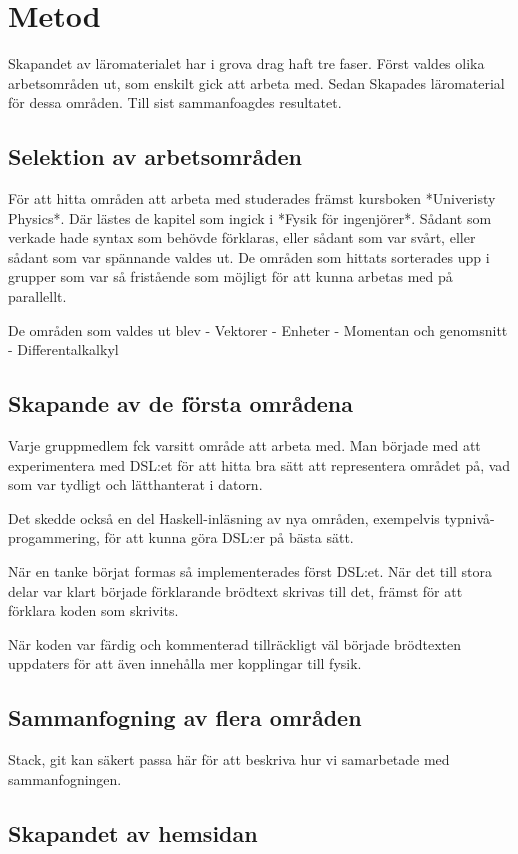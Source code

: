 
\chapter{Metod}

Skapandet av läromaterialet har i grova drag haft tre faser. Först valdes olika arbetsområden ut, som enskilt gick att arbeta med. Sedan Skapades läromaterial för dessa områden. Till sist sammanfoagdes resultatet.

\section{Selektion av arbetsområden}

För att hitta områden att arbeta med studerades främst kursboken *Univeristy Physics*. Där lästes de kapitel som ingick i *Fysik för ingenjörer*. Sådant som verkade hade syntax som behövde förklaras, eller sådant som var svårt, eller sådant som var spännande valdes ut. De områden som hittats sorterades upp i grupper som var så fristående som möjligt för att kunna arbetas med på parallellt.

De områden som valdes ut blev
- Vektorer
- Enheter
- Momentan och genomsnitt
- Differentalkalkyl

\section{Skapande av de första områdena}

Varje gruppmedlem fck varsitt område att arbeta med. Man började med att experimentera med DSL:et för att hitta bra sätt att representera området på, vad som var tydligt och lätthanterat i datorn.

Det skedde också en del Haskell-inläsning av nya områden, exempelvis typnivå-progammering, för att kunna göra DSL:er på bästa sätt.

När en tanke börjat formas så implementerades först DSL:et. När det till stora delar var klart började förklarande brödtext skrivas till det, främst för att förklara koden som skrivits.

När koden var färdig och kommenterad tillräckligt väl började brödtexten uppdaters för att även innehålla mer kopplingar till fysik.

\section{Sammanfogning av flera områden}

Stack, git kan säkert passa här för att beskriva hur vi samarbetade med sammanfogningen.

\section{Skapandet av hemsidan}